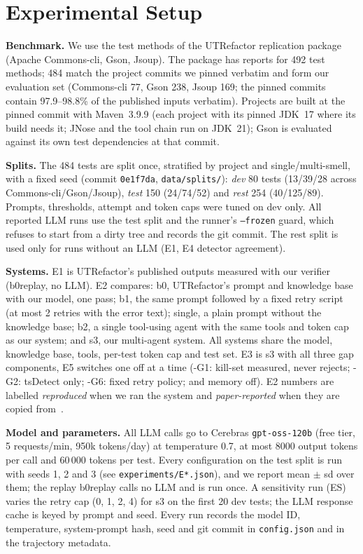 \section{Experimental Setup}\label{sec:setup}

\textbf{Benchmark.} We use the test methods of the UTRefactor replication package~\cite{utrefactor}
(Apache Commons-cli, Gson, Jsoup). The package has reports for 492 test methods; 484 match the project commits we pinned
verbatim and form our evaluation set (Commons-cli 77, Gson 238, Jsoup 169; the pinned commits contain 97.9--98.8\% of the published inputs verbatim).
Projects are built at the pinned commit with Maven~3.9.9 (each project with its pinned JDK~17 where its build needs it; JNose and the tool chain run on JDK~21); Gson is evaluated against its own test dependencies at that commit.

\textbf{Splits.} The 484 tests are split once, stratified by project and single/multi-smell, with a fixed seed (commit \texttt{0e1f7da},
\texttt{data/splits/}): \emph{dev} 80 tests (13/39/28 across Commons-cli/Gson/Jsoup), \emph{test} 150 (24/74/52) and \emph{rest} 254 (40/125/89).
Prompts, thresholds, attempt and token caps were tuned on dev only. All reported LLM runs use the test split and the runner's \texttt{--frozen}
guard, which refuses to start from a dirty tree and records the git commit. The rest split is used only for runs without an LLM (E1, E4 detector agreement).

\textbf{Systems.} E1 is UTRefactor's published outputs measured with our verifier (\textsf{b0replay}, no LLM).
E2 compares: \textsf{b0}, UTRefactor's prompt and knowledge base with our model, one pass; \textsf{b1}, the same prompt followed by a fixed retry
script (at most 2 retries with the error text); \textsf{single}, a plain prompt without the knowledge base; \textsf{b2}, a single tool-using agent
with the same tools and token cap as our system; and \textsf{s3}, our multi-agent system. All systems share the model, knowledge base, tools,
per-test token cap and test set. E3 is \textsf{s3} with all three gap components, E5 switches one off at a time
(\textsf{-G1}: kill-set measured, never rejects; \textsf{-G2}: tsDetect only; \textsf{-G6}: fixed retry policy; and memory off).
E2 numbers are labelled \emph{reproduced} when we ran the system and \emph{paper-reported} when they are copied from~\cite{utrefactor}.

\textbf{Model and parameters.} All LLM calls go to Cerebras \texttt{gpt-oss-120b} (free tier, 5 requests/min, 950k tokens/day) at temperature 0.7, at most
8000 output tokens per call and 60\,000 tokens per test. Every configuration on the test split is run with seeds 1, 2 and 3 (see \texttt{experiments/E*.json}), and we report mean $\pm$ sd over them; the replay \textsf{b0replay} calls no LLM and is run once. A sensitivity run (ES) varies the retry cap (0, 1, 2, 4) for \textsf{s3} on the first 20 dev tests; the LLM response cache is keyed by prompt and seed.
Every run records the model ID, temperature, system-prompt hash, seed and git commit in \texttt{config.json} and in the trajectory metadata.

